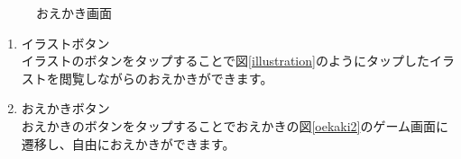 \documentclass[a4j]{jarticle}
\begin{document}
\begin{figure}[H]
    \begin{center}
    \caption {おえかき画面}
    \label{oekaki}
    \end{center}
\end{figure}

\begin{enumerate}
  \renewcommand{\labelenumi}{\textcircled{\scriptsize \theenumi}}
\item イラストボタン\\
  イラストのボタンをタップすることで図\ref{illustration}のようにタップしたイラストを閲覧しながらのおえかきができます。
\item おえかきボタン\\
  おえかきのボタンをタップすることでおえかきの図\ref{oekaki2}のゲーム画面に遷移し、自由におえかきができます。
\end{enumerate}
\end{document}
